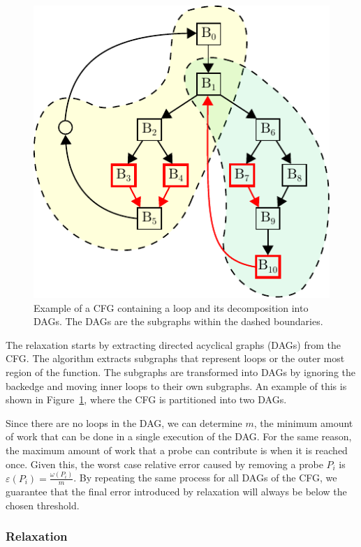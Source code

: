     \begin{figure}[t]
      \centering
      \includegraphics[scale=0.8]{figs/cfg-relax-example.pdf}
      \caption{Example of a CFG containing a loop and its decomposition into DAGs.
               The DAGs are the subgraphs within the dashed boundaries.}
      \vspace{-4mm}
      \label{fig:cfg-relax-example}
    \end{figure}

    The \WCRelaxLower relaxation starts by extracting directed acyclical graphs (DAGs) from the CFG. The algorithm extracts subgraphs that
    represent loops or the outer most region of the function. The subgraphs are transformed into DAGs by ignoring the backedge and moving
    inner loops to their own subgraphs. An example of this is shown in Figure~\ref{fig:cfg-relax-example}, where the CFG is partitioned
    into two DAGs.

    Since there are no loops in the DAG, we can determine $m$, the minimum amount of work that can be done in a single execution of the
    DAG. For the same reason, the maximum amount of work that a probe can contribute is when it is reached once. Given this, the worst case
    relative error caused by removing a probe $P_i$ is $\varepsilon(P_i) = \frac{\omega(P_i)}{m}$. By repeating the same process for
    all DAGs of the CFG, we guarantee that the final error introduced by relaxation will always be below the chosen threshold.

    \subsubsection{\WPRelaxTitle Relaxation}

